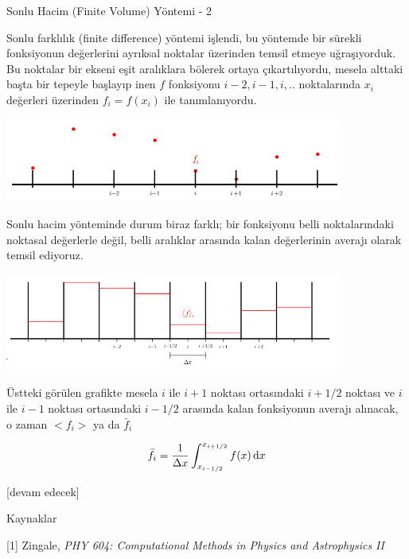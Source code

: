 \documentclass[12pt,fleqn]{article}\usepackage{../../common}
\begin{document}
Sonlu Hacim (Finite Volume) Yöntemi - 2

Sonlu farklılık (finite difference) yöntemi işlendi, bu yöntemde bir sürekli
fonksiyonun değerlerini ayrıksal noktalar üzerinden temsil etmeye uğraşıyorduk.
Bu noktalar bir ekseni eşit aralıklara bölerek ortaya çıkartılıyordu, mesela
alttaki başta bir tepeyle başlayıp inen $f$ fonksiyonu $i-2,i-1,i,..$
noktalarında $x_i$ değerleri üzerinden $f_i = f(x_i)$ ile tanımlanıyordu.

\includegraphics[width=30em]{13-22-29.png}

Sonlu hacim yönteminde durum biraz farklı; bir fonksiyonu belli noktalarındaki
noktasal değerlerle değil, belli aralıklar arasında kalan değerlerinin averajı
olarak temsil ediyoruz.

\includegraphics[width=30em]{13-22-34.png}

Üstteki görülen grafikte mesela $i$ ile $i+1$ noktası ortasındaki $i+1/2$
noktası ve $i$ ile $i-1$ noktası ortasındaki $i-1/2$ arasında kalan fonksiyonun
averajı alınacak, o zaman $<f_i>$ ya da $\bar{f}_i$

$$
\bar{f}_i = \frac{1}{\Delta x} \int _{x_{i-1/2}}^{x_{i+1/2}} f(x) \,\mathrm{d} x
$$






[devam edecek]
  
Kaynaklar

[1] Zingale, {\em PHY 604: Computational Methods in Physics and Astrophysics II}
\end{document}
